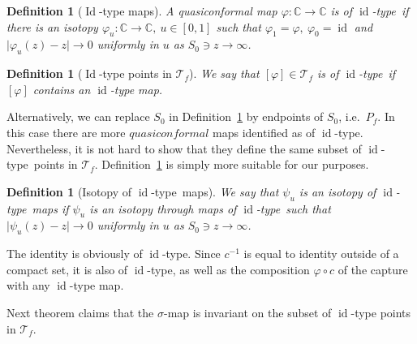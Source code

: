 \documentclass[10pt,reqno,a4paper]{amsart}
\numberwithin{figure}{section}
\numberwithin{equation}{section}
\newtheorem{defn}[thm]{Definition}
\newcommand{\qc}{quasiconformal}
\newcommand{\idt}{of $\id$-type}
\newcommand{\id}{\operatorname{id}}
\newcommand{\Id}{\operatorname{Id}}
\newcommand{\abs}[1]{\lvert #1 \rvert}
\begin{document}
\begin{defn}[$\Id$-type maps]
	\label{defn:id_type}
	A quasiconformal map $\varphi:\mathbb{C}\to \mathbb{C}$ is \idt\ if there is an isotopy $\varphi_u:\mathbb{C}\to\mathbb{C},\ u\in [0,1]$ such that ${\varphi_1=\varphi},\ \varphi_0=\id$ and $\abs{\varphi_u(z)-z}\to 0$ uniformly in $u$ as $S_0\ni z\to \infty$.
\end{defn}

\begin{defn}[$\Id$-type points in $\mathcal{T}_f$]
	We say that $[\varphi]\in\mathcal{T}_f$ is \idt\ if $[\varphi]$ contains an $\id$-type map.	
\end{defn}

Alternatively, we can replace $S_0$ in Definition~\ref{defn:id_type} by endpoints of $S_0$, i.e.\ $P_f$. In this case there are more $\qc$ maps identified as \idt. Nevertheless, it is not hard to show that they define the same subset \idt\ points in $\mathcal{T}_f$. Definition~\ref{defn:id_type} is simply more suitable for our purposes.

\begin{defn}[Isotopy \idt\ maps]
	We say that $\psi_u$ is an \emph{isotopy \idt\ maps} if $\psi_u$ is an isotopy through maps \idt\ such that $\abs{\psi_u(z)-z}\to 0$ uniformly in $u$ as $S_0\ni z\to \infty$.
\end{defn}

The identity is obviously \idt. Since $c^{-1}$ is equal to identity outside of a compact set, it is also \idt, as well as the composition $\varphi\circ c$ of the capture with any $\id$-type map.

Next theorem claims that the $\sigma$-map is invariant on the subset of $\id$-type points in $\mathcal{T}_f$.
\end{document}
